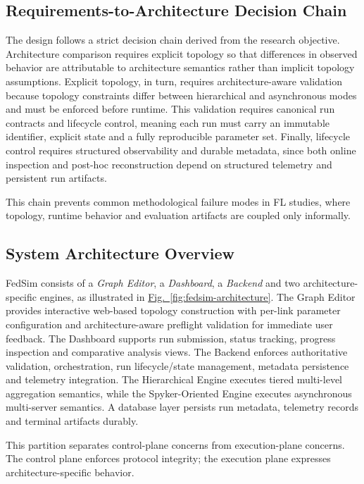 \documentclass[conference]{IEEEtran}
\newcommand{\figref}[1]{\hyperref[#1]{Fig.~\ref*{#1}}}
\begin{document}
\subsection{Requirements-to-Architecture Decision Chain}
The design follows a strict decision chain derived from the research objective. Architecture comparison requires explicit topology so that differences in observed behavior are attributable to architecture semantics rather than implicit topology assumptions. Explicit topology, in turn, requires architecture-aware validation because topology constraints differ between hierarchical and asynchronous modes and must be enforced before runtime. This validation requires canonical run contracts and lifecycle control, meaning each run must carry an immutable identifier, explicit state and a fully reproducible parameter set. Finally, lifecycle control requires structured observability and durable metadata, since both online inspection and post-hoc reconstruction depend on structured telemetry and persistent run artifacts.

This chain prevents common methodological failure modes in FL studies, where topology, runtime behavior and evaluation artifacts are coupled only informally.

\subsection{System Architecture Overview}
FedSim consists of a \textit{Graph Editor}, a \textit{Dashboard}, a \textit{Backend} and two architecture-specific engines, as illustrated in \figref{fig:fedsim-architecture}. The Graph Editor provides interactive web-based topology construction with per-link parameter configuration and architecture-aware preflight validation for immediate user feedback. The Dashboard supports run submission, status tracking, progress inspection and comparative analysis views. The Backend enforces authoritative validation, orchestration, run lifecycle/state management, metadata persistence and telemetry integration. The Hierarchical Engine executes tiered multi-level aggregation semantics, while the Spyker-Oriented Engine executes asynchronous multi-server semantics. A database layer persists run metadata, telemetry records and terminal artifacts durably.

This partition separates control-plane concerns from execution-plane concerns. The control plane enforces protocol integrity; the execution plane expresses architecture-specific behavior.
\end{document}
